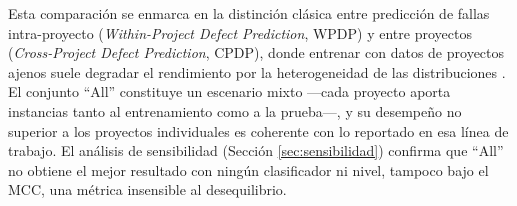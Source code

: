 Esta comparación se enmarca en la distinción clásica entre predicción de fallas intra-proyecto (\textit{Within-Project Defect Prediction}, WPDP) y entre proyectos (\textit{Cross-Project Defect Prediction}, CPDP), donde entrenar con datos de proyectos ajenos suele degradar el rendimiento por la heterogeneidad de las distribuciones \cite{cheng2022,sharma2023far}. El conjunto ``All'' constituye un escenario mixto ---cada proyecto aporta instancias tanto al entrenamiento como a la prueba---, y su desempeño no superior a los proyectos individuales es coherente con lo reportado en esa línea de trabajo. El análisis de sensibilidad (Sección \ref{sec:sensibilidad}) confirma que ``All'' no obtiene el mejor resultado con ningún clasificador ni nivel, tampoco bajo el MCC, una métrica insensible al desequilibrio.

\noindent{}
\vspace{12pt}